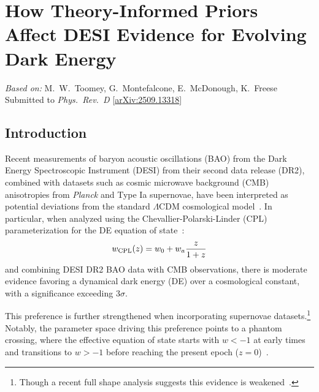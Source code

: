 \chapter{How Theory-Informed Priors Affect DESI Evidence for Evolving Dark Energy}
\label{ch:desi-dark-energy}

\begin{center}
\textit{Based on:} M.~W.~Toomey, G.~Montefalcone, E.~McDonough, K.~Freese\\
Submitted to \textit{Phys.\ Rev.\ D}
[\href{https://arxiv.org/abs/2509.13318}{arXiv:2509.13318}]
\end{center}
\vspace{1em}

\newcommand{\MT}[1]{}
\newcommand{\EM}[1]{}
\newcommand{\GM}[1]{}


\section{Introduction}
\label{sec:ch11-intro}

\noindent Recent measurements of baryon acoustic oscillations (BAO) from the Dark Energy Spectroscopic Instrument (DESI)  from their second data release (DR2), combined with datasets such as cosmic microwave background (CMB) anisotropies from \textit{Planck} and Type Ia supernovae, have been interpreted as  potential deviations from the standard $\Lambda$CDM cosmological model~\cite{DESI:2024mwx,DESI:2025zgx}. In particular,  when analyzed using the Chevallier-Polarski-Linder (CPL) parameterization for the DE equation of state~\cite{Chevallier:2000qy,Linder:2002et}:
\begin{equation}\label{eq:ch11-cpl}
    w_{\rm CPL}(z) = w_0 + w_a \frac{z}{1+z}
\end{equation}
and combining DESI DR2 BAO data with CMB observations, there is moderate evidence favoring a dynamical dark energy (DE) over a cosmological constant, with a significance exceeding $3\sigma$.

 This preference is further strengthened when incorporating supernovae datasets.\footnote{ Though a recent full shape analysis suggests this evidence is weakened~\cite{Chudaykin:2025aux}.} Notably, the parameter space driving this preference points to a phantom crossing, where the effective equation of state starts with $w < -1$ at early times and transitions to $w > -1$ before reaching the present epoch ($z = 0$)~\cite{DESI:2025fii}.

